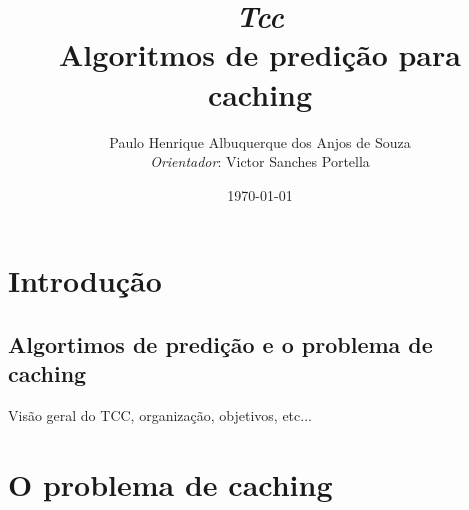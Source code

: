 \documentclass[a4paper,oneside,reqno,12pt]{amsart}
\begin{document}
\baselineskip
\frenchspacing

% 
% 

\setcounter{page}{1}

\title{%
{\small\sl Tcc}\\
\smallskip
Algoritmos de predição para caching}

\author{%
Paulo Henrique Albuquerque dos Anjos de Souza \\
{\tiny\emph{Orientador}:  Victor Sanches Portella}
}
%
%

\date{\today}
\maketitle

\pagestyle{plain}
\footskip=25pt

\vspace{-20pt}


\section{Introdução}

\subsection{Algortimos de predição e o problema de caching}

Visão geral do TCC, organização, objetivos, etc...

\section{O problema de caching}
\end{document}
